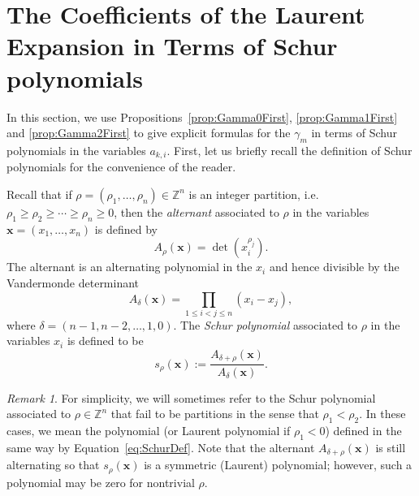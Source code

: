 \documentclass{amsart}
\theoremstyle{definition}
\theoremstyle{remark}
\newtheorem{remark}[theorem]{Remark}
\newcommand{\Z}{\mathbb{Z}}
\newcommand{\bs}{\boldsymbol}
\begin{document}

\section{The Coefficients of the Laurent Expansion in Terms of Schur polynomials}
\label{sec:LaurentSchur}

In this section, we use Propositions~\ref{prop:Gamma0First}, \ref{prop:Gamma1First} and \ref{prop:Gamma2First} to give
explicit formulas for the $\gamma_m$ in terms of Schur polynomials in the variables $a_{k,i}$.
First, let us briefly recall the definition of Schur polynomials for the convenience of the
reader.

Recall that if
$\rho = (\rho_1,\ldots,\rho_n) \in \Z^n$ is an integer partition, i.e. $\rho_1\geq\rho_2\geq\cdots\geq \rho_n\geq 0$,
then the \emph{alternant} associated to $\rho$ in the variables $\bs{x} = (x_1,\ldots,x_n)$ is defined by
\[
    A_\rho(\bs{x}) = \det\left( x_i^{ \rho_j } \right).
\]
The alternant is an alternating polynomial in the $x_i$ and hence divisible by the Vandermonde determinant
\[
    A_\delta(\bs{x}) = \prod\limits_{1\leq i < j\leq n} (x_i - x_j),
\]
where $\delta = (n-1,n-2,\ldots,1,0)$. The \emph{Schur polynomial} associated to $\rho$ in the variables $x_i$
is defined to be
\begin{equation}
\label{eq:SchurDef}
    s_\rho(\bs{x}) :=   \frac{ A_{\delta+\rho}( \bs{x} ) }{ A_\delta ( \bs{x} ) }.
\end{equation}


\begin{remark}
\label{rem:NonStandScur}
For simplicity, we will sometimes refer to the Schur polynomial associated to $\rho\in\Z^n$ that fail to
be partitions in the sense that $\rho_1 < \rho_2$. In these cases, we mean the polynomial (or
Laurent polynomial if $\rho_1 < 0$) defined in the same way by Equation~\eqref{eq:SchurDef}. Note that
the alternant $A_{\delta+\rho}(\bs{x})$ is still alternating so that $s_\rho(\bs{x})$ is a symmetric
(Laurent) polynomial; however, such a polynomial may be zero for nontrivial $\rho$.
\end{remark}
\end{document}
